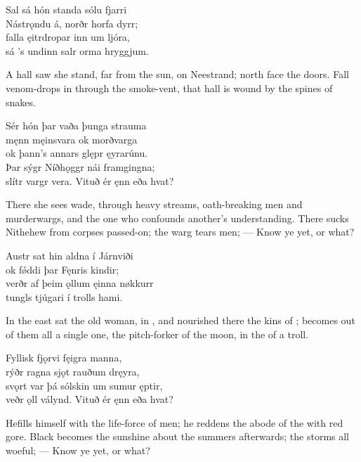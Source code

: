 \bva Sal sá hón standa \hld sólu fjarri \\%
Nástrǫndu á, \hld norðr horfa dyrr; \\%
falla ęitrdropar \hld inn um ljóra, \\%
sá ’s undinn salr \hld orma hryggjum.\eva

\bvb A hall saw she stand, far from the sun, on Neestrand; north face the doors. Fall venom-drops in through the smoke-vent, that hall is wound by the spines of snakes.\evb

\bva Sér hón þar vaða \hld þunga strauma \\%
męnn męinsvara \hld ok morðvarga \\%
ok þann’s annars glępr \hld ęyrarúnu. \\%
Þar sýgr Níðhǫggr \hld nái framgingna; \\%
slítr vargr vera. \hld Vituð ér ęnn eða hvat?\eva

\bvb There she sees wade, through heavy streams, oath-breaking men and murderwargs, and the one who confounds another’s understanding\footnotemark[1]. There sucks Nithehew from corpses passed-on; the warg tears men; — Know ye yet, or what?\evb
{}

\bva Austr sat hin aldna \hld í Járnviði \\%
ok fǿddi þar \hld Fęnris kindir; \\%
verðr af þeim ǫllum \hld ęinna nøkkurr \\%
tungls tjúgari \hld í trolls hami.\eva

\bvb In the east sat the old woman, in , and nourished there the kins of ; becomes out of them all a single one, the pitch-forker of the moon, in the  of a troll.\footnotemark[1]\evb
{}

\bva Fyllisk fjǫrvi \hld fęigra manna, \\%
rýðr ragna sjǫt \hld rauðum dręyra, \\%
svǫrt var þá sólskin \hld um sumur ęptir, \\%
veðr ǫll válynd. \hld Vituð ér ęnn eða hvat?\eva

\bvb He\footnotemark[1] fills himself with the life-force of  men; he reddens the abode of the  with red gore. Black becomes the sunshine about the summers afterwards\footnotemark[2]; the storms all woeful; — Know ye yet, or what?\evb
{}

